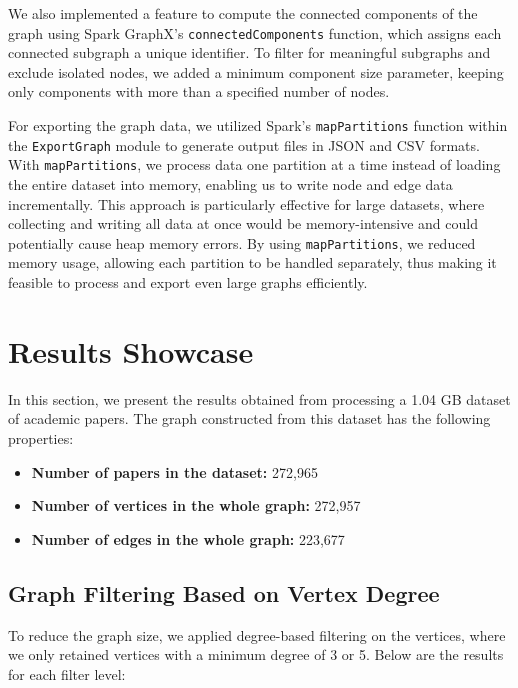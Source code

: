 \documentclass[a4paper, 11pt]{article}
\begin{document}
We also implemented a feature to compute the connected components of the graph using Spark GraphX's \texttt{connectedComponents} function, which assigns each connected subgraph a unique identifier. To filter for meaningful subgraphs and exclude isolated nodes, we added a minimum component size parameter, keeping only components with more than a specified number of nodes.

For exporting the graph data, we utilized Spark’s \texttt{mapPartitions} function within the \texttt{ExportGraph} module to generate output files in JSON and CSV formats. With \texttt{mapPartitions}, we process data one partition at a time instead of loading the entire dataset into memory, enabling us to write node and edge data incrementally. This approach is particularly effective for large datasets, where collecting and writing all data at once would be memory-intensive and could potentially cause heap memory errors. By using \texttt{mapPartitions}, we reduced memory usage, allowing each partition to be handled separately, thus making it feasible to process and export even large graphs efficiently.

\section{Results Showcase}

In this section, we present the results obtained from processing a 1.04 GB dataset of academic papers. The graph constructed from this dataset has the following properties:

\begin{itemize}
    \item \textbf{Number of papers in the dataset:} 272,965
    \item \textbf{Number of vertices in the whole graph:} 272,957
    \item \textbf{Number of edges in the whole graph:} 223,677
\end{itemize}

\subsection{Graph Filtering Based on Vertex Degree}

To reduce the graph size, we applied degree-based filtering on the vertices, where we only retained vertices with a minimum degree of 3 or 5. Below are the results for each filter level:
\end{document}
